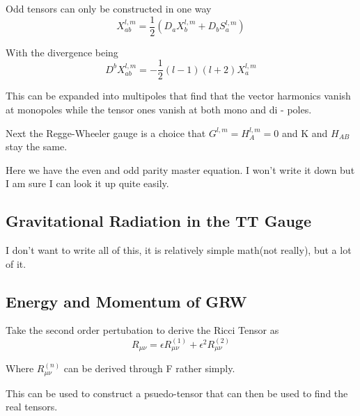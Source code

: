   Odd tensors can only be constructed in one way
\[
X^{l,m}_{ab} = \frac{1}{2}(D_aX^{l,m}_b + D_b S^{l,m}_a)
  \]

  With the divergence being
\[
D^b X^{l,m}_{ab} = -\frac{1}{2}(l-1)(l+2)X^{l,m}_a
  \]

  This can be expanded into multipoles that find that the vector harmonics vanish at monopoles while the tensor ones vanish at both mono and di - poles.

  Next the Regge-Wheeler gauge is a choice that $G^{l,m}=H_A^{l,m}=0$ and K and $H_{AB}$ stay the same.

  Here we have the even and odd parity master equation. I won't write it down but I am sure I can look it up quite easily.

\subsection{Gravitational Radiation in the TT Gauge}

I don't want to write all of this, it is relatively simple math(not really), but a lot of it.

\subsection{Energy and Momentum of GRW}

Take the second order pertubation to derive the Ricci Tensor as
\[
R_{\mu \nu} = \epsilon R^{(1)}_{\mu \nu} + \epsilon^2 R^{(2)}_{\mu \nu}
  \]

  Where $R^{(n)}_{\mu \nu}$ can be derived through F rather simply.

This can be used to construct a psuedo-tensor that can then be used to find the real tensors.
